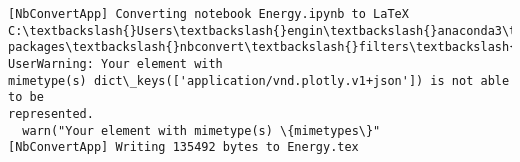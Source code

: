 \documentclass[11pt]{article}
\makeatletter
\newcommand{\boxspacing}{\kern\kvtcb@left@rule\kern\kvtcb@boxsep}
\newcommand{\prompt}[4]{
        \ttfamily\llap{{\color{#2}[#3]:\hspace{3pt}#4}}\vspace{-\baselineskip}
    }
\makeatother
\begin{document}
    \begin{Verbatim}[commandchars=\\\{\}]
[NbConvertApp] Converting notebook Energy.ipynb to LaTeX
C:\textbackslash{}Users\textbackslash{}engin\textbackslash{}anaconda3\textbackslash{}lib\textbackslash{}site-
packages\textbackslash{}nbconvert\textbackslash{}filters\textbackslash{}datatypefilter.py:39: UserWarning: Your element with
mimetype(s) dict\_keys(['application/vnd.plotly.v1+json']) is not able to be
represented.
  warn("Your element with mimetype(s) \{mimetypes\}"
[NbConvertApp] Writing 135492 bytes to Energy.tex
    \end{Verbatim}

    \begin{tcolorbox}[breakable, size=fbox, boxrule=1pt, pad at break*=1mm,colback=cellbackground, colframe=cellborder]
\prompt{In}{incolor}{ }{\boxspacing}
\begin{Verbatim}[commandchars=\\\{\}]

\end{Verbatim}
\end{tcolorbox}

    


    
    
    
\end{document}

